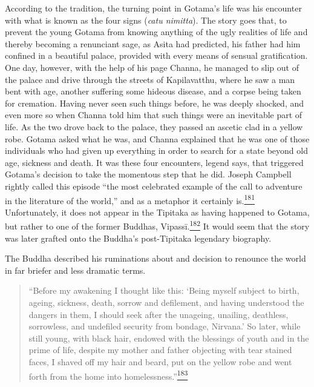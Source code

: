 According to the tradition, the turning point in Gotama's life was his
encounter with what is known as the four signs (\emph{catu nimitta}).
The story goes that, to prevent the young Gotama from knowing anything
of the ugly realities of life and thereby becoming a renunciant sage, as
Asita had predicted, his father had him confined in a beautiful palace,
provided with every means of sensual gratification. One day, however,
with the help of his page Channa, he managed to slip out of the palace
and drive through the streets of Kapilavatthu, where he saw a man bent
with age, another suffering some hideous disease, and a corpse being
taken for cremation. Having never seen such things before, he was deeply
shocked, and even more so when Channa told him that such things were an
inevitable part of life. As the two drove back to the palace, they
passed an ascetic clad in a yellow robe. Gotama asked what he was, and
Channa explained that he was one of those individuals who had given up
everything in order to search for a state beyond old age, sickness and
death. It was these four encounters, legend says, that triggered
Gotama's decision to take the momentous step that he did. Joseph
Campbell rightly called this episode ``the most celebrated example of
the call to adventure in the literature of the world,'' and as a
metaphor it certainly
is.\label{footprints_split_009.html_fnref181}\hyperref[footprints_split_024.htmlux5cux23fn181]{\textsuperscript{181}}
Unfortunately, it does not appear in the Tipitaka as having happened to
Gotama, but rather to one of the former Buddhas,
Vipassī.\label{footprints_split_009.html_fnref182}\hyperref[footprints_split_024.htmlux5cux23fn182]{\textsuperscript{182}}
It would seem that the story was later grafted onto the Buddha's
post-Tipitaka legendary biography.

The Buddha described his ruminations about and decision to renounce the
world in far briefer and less dramatic terms.

\begin{quote}
``Before my awakening I thought like this: `Being myself subject to
birth, ageing, sickness, death, sorrow and defilement, and having
understood the dangers in them, I should seek after the unageing,
unailing, deathless, sorrowless, and undefiled security from bondage,
Nirvana.' So later, while still young, with black hair, endowed with the
blessings of youth and in the prime of life, despite my mother and
father objecting with tear stained faces, I shaved off my hair and
beard, put on the yellow robe and went forth from the home into
homelessness.''\label{footprints_split_009.html_fnref183}\hyperref[footprints_split_024.htmlux5cux23fn183]{\textsuperscript{183}}
\end{quote}


